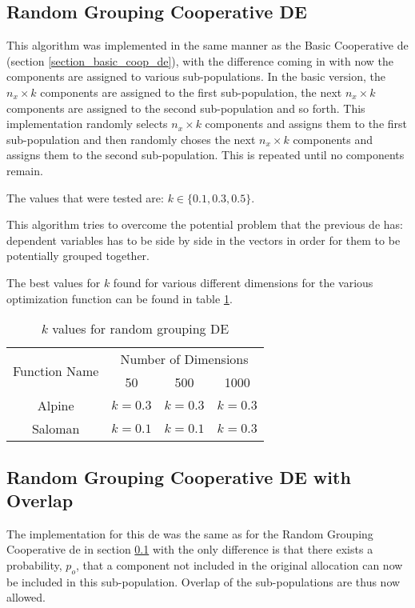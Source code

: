 \documentclass[hidelinks,english,conference]{IEEEtran}
\begin{document}
	\subsection{Random Grouping Cooperative DE}\label{section_random_de} %
		This algorithm was implemented in the same manner as the Basic Cooperative \gls{de} (section \ref{section_basic_coop_de}), with the difference coming in with now the components are assigned to various sub-populations. In the basic version, the $n_x \times k$ components are assigned to the first sub-population, the next $n_x \times k$ components are assigned to the second sub-population and so forth. This implementation randomly selects $n_x \times k$ components and assigns them to the first sub-population and then randomly choses the next $n_x \times k$ components and assigns them to the second sub-population. This is repeated until no components remain.
        
        The values that were tested are: $k \in \lbrace 0.1, 0.3, 0.5 \rbrace$.

		This algorithm tries to overcome the potential problem that the previous \gls{de} has: dependent variables has to be side by side in the vectors in order for them to be potentially grouped together.

		The best values for $k$ found for various different dimensions for the various optimization function can be found in table \ref{table_random_de_k_value}.

		\begin{table}
			\centering
			\begin{tabular}{ | c | c | c | c | }
				\hline
				\multirow{2}{*}{Function Name} & \multicolumn{3}{|c|}{Number of Dimensions} \\\cline{2-4}
				 & 50 & 500 & 1000\\
				\hline
				Alpine & $k=0.3$ & $k=0.3$ & $k=0.3$ \\
				\hline
				Saloman & $k=0.1$ & $k=0.1$ & $k=0.3$ \\
				\hline
			\end{tabular}
			\caption{$k$ values for random grouping DE}
			\label{table_random_de_k_value}
		\end{table}

	\subsection{Random Grouping Cooperative DE with Overlap} %
		The implementation for this \gls{de} was the same as for the Random Grouping Cooperative \gls{de} in section \ref{section_random_de} with the only difference is that there exists a probability, $p_o$, that a component not included in the original allocation can now be included in this sub-population. Overlap of the sub-populations are thus now allowed.
        
\end{document}
